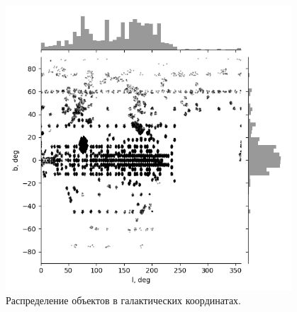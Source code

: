 \documentclass{matmex-diploma-custom}
\begin{document}
\pagebreak

\begin{figure}[h!]
\begin{minipage}[h]{1.0\linewidth}
        \includegraphics[width=0.95\textwidth]{../imgs/lb.png}
\end{minipage}
\caption{Распределение объектов в галактических координатах.}
\end{figure}

\pagebreak
\end{document}
